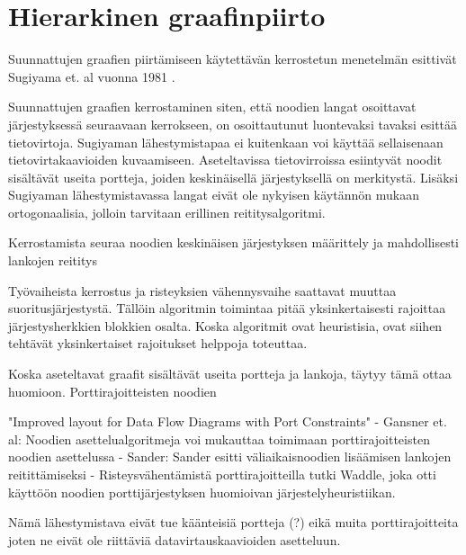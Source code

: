 \documentclass[finnish,12pt]{article}
\begin{document}

	\clearpage
	\section{Hierarkinen graafinpiirto}
	

Suunnattujen graafien piirtämiseen käytettävän kerrostetun menetelmän
esittivät Sugiyama et. al vuonna 1981 \cite{RefWorks:9}.

Suunnattujen graafien kerrostaminen siten, että noodien langat osoittavat järjestyksessä seuraavaan kerrokseen,
on osoittautunut luontevaksi tavaksi esittää tietovirtoja. Sugiyaman lähestymistapaa ei kuitenkaan voi käyttää sellaisenaan tietovirtakaavioiden kuvaamiseen. Aseteltavissa tietovirroissa esiintyvät noodit sisältävät useita portteja, joiden keskinäisellä järjestyksellä on merkitystä. Lisäksi Sugiyaman lähestymistavassa langat eivät ole nykyisen käytännön mukaan ortogonaalisia, jolloin tarvitaan erillinen reititysalgoritmi.

Kerrostamista seuraa noodien keskinäisen järjestyksen määrittely ja mahdollisesti lankojen reititys

Työvaiheista kerrostus ja risteyksien vähennysvaihe saattavat muuttaa suoritusjärjestystä.
Tällöin algoritmin toimintaa pitää yksinkertaisesti rajoittaa järjestysherkkien blokkien osalta.
Koska algoritmit ovat heuristisia, ovat siihen tehtävät yksinkertaiset rajoitukset helppoja toteuttaa.

Koska aseteltavat graafit sisältävät useita portteja ja lankoja, täytyy tämä ottaa huomioon. Porttirajoitteisten noodien

"Improved layout for Data Flow Diagrams with Port Constraints"
- Gansner et. al: Noodien asettelualgoritmeja voi mukauttaa toimimaan porttirajoitteisten noodien asettelussa
- Sander: Sander esitti väliaikaisnoodien lisäämisen lankojen reitittämiseksi
- Risteysvähentämistä porttirajoitteilla tutki Waddle, joka otti käyttöön noodien porttijärjestyksen huomioivan järjestelyheuristiikan.

Nämä lähestymistava eivät tue käänteisiä portteja (?) eikä muita porttirajoitteita joten ne eivät ole riittäviä datavirtauskaavioiden asetteluun.
\end{document}
